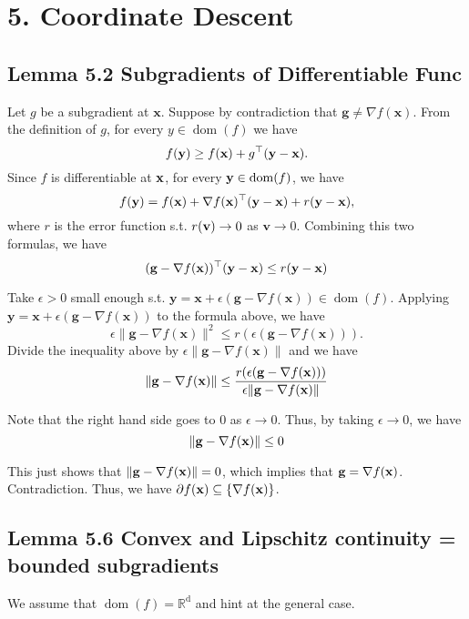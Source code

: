 \section*{5. Coordinate Descent}
\subsection*{Lemma 5.2 Subgradients of Differentiable Func}
Let $g$ be a subgradient at $\mathbf{x}$. Suppose by contradiction that $\mathbf{g} \neq \nabla f(\mathbf{x})$. From the definition of $g$, for every $y \in \operatorname{dom}(f)$ we have
$$
f(\boldsymbol{\mathbf{y}}) \geq f(\boldsymbol{\mathbf{x}})+g^{\top}(\boldsymbol{\mathbf{y}}-\boldsymbol{\mathbf{x}}) .
$$
Since $f$ is differentiable at $\boldsymbol{\mathbf{x}}$, for every $\boldsymbol{\mathbf{y}} \in \operatorname{dom}(f)$, we have
$$
f(\boldsymbol{\mathbf{y}})=f(\boldsymbol{\mathbf{x}})+\nabla f(\boldsymbol{\mathbf{x}})^{\top}(\boldsymbol{\mathbf{y}}-\boldsymbol{\mathbf{x}})+r(\boldsymbol{\mathbf{y}}-\boldsymbol{\mathbf{x}}),
$$
where $r$ is the error function s.t. $r(\boldsymbol{\mathbf{v}}) \rightarrow 0$ as $\mathbf{v} \rightarrow 0$. Combining this two formulas, we have
$$
(\mathbf{g}-\nabla f(\boldsymbol{\mathbf{x}}))^{\top}(\mathbf{y}-\mathbf{x}) \leq r(\mathbf{y}-\mathbf{x})
$$

Take $\epsilon>0$ small enough s.t. $\mathbf{y}=\mathbf{x}+\epsilon(\mathbf{g}-\nabla f(\mathbf{x})) \in \operatorname{dom}(f)$. Applying $\mathbf{y}=\mathbf{x}+\epsilon(\mathbf{g}-\nabla f(\mathbf{x}))$ to the formula above, we have
$$
\epsilon\|\mathbf{g}-\nabla f(\mathbf{x})\|^{2} \leq r(\epsilon(\mathbf{g}-\nabla f(\mathbf{x}))) .
$$
Divide the inequality above by $\epsilon\|\mathbf{g}-\nabla f(\mathbf{x})\|$ and we have
$$
\|\mathbf{g}-\nabla f(\boldsymbol{\mathbf{x}})\| \leq \frac{r(\epsilon(\mathbf{g}-\nabla f(\mathbf{x})))}{\epsilon\|\mathbf{g}-\nabla f(\mathbf{x})\|}
$$

Note that the right hand side goes to 0 as $\epsilon \rightarrow 0$. Thus, by taking $\epsilon \rightarrow 0$, we have
$$
\|\mathbf{g}-\nabla f(\boldsymbol{\mathbf{x}})\| \leq 0
$$

This just shows that $\|\boldsymbol{\mathbf{g}}-\nabla f(\boldsymbol{\mathbf{x}})\|=0$, which implies that $\boldsymbol{\mathbf{g}}=\nabla f(\boldsymbol{\mathbf{x}})$. Contradiction. Thus, we have $\partial f(\boldsymbol{\mathbf{x}}) \subseteq\{\nabla f(\boldsymbol{\mathbf{x}})\}$.








\subsection*{Lemma 5.6 Convex and Lipschitz continuity = bounded subgradients}
We assume that $\operatorname{dom}(f)=\mathbb{R}^{\mathrm{d}}$ and hint at the general case. 

